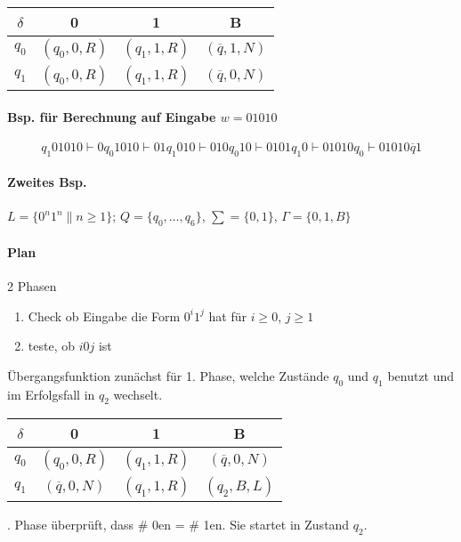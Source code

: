 \begin{table}[htb!]
\centering
\begin{tabular}{c|c c c}
$\delta$ & 0 & 1 & B \\
\hline 
$q_0$ & $(q_0,0,R)$ & $(q_1,1,R)$ & $(\overline{q},1,N)$ \\
$q_1$ & $(q_0,0,R)$ & $(q_1,1,R)$ & $(\overline{q},0,N)$ \\
\end{tabular}
\end{table}

\paragraph*{Bsp. für Berechnung auf Eingabe $w=01010$} $$q_1 01010 \vdash 0q_0 1010 \vdash 01q_1 010 \vdash 010q_0 10 \vdash 0101q_1 0 \vdash 01010q_0 \vdash 01010\overline{q}1$$

\paragraph*{Zweites Bsp.} $L=\{ 0^n1^n \| n \geq 1 \}$; $Q=\{ q_0,\dots,q_6 \}$, $\sum=\{0,1\}$, $\Gamma=\{0,1,B\}$

\paragraph*{Plan} 2 Phasen
\begin{enumerate}
	\item Check ob Eingabe die Form $0^i1^j$ hat für $i \geq 0$, $j \geq 1$
	\item teste, ob $i0j$ ist
\end{enumerate}
Übergangsfunktion zunächst für 1. Phase, welche Zustände $q_0$ und $q_1$ benutzt und im Erfolgsfall in $q_2$ wechselt.

\begin{table}[htb!]
\centering
\begin{tabular}{c|c c c}
$\delta$ & 0 & 1 & B \\
\hline 
$q_0$ & $(q_0,0,R)$ & $(q_1,1,R)$ & $(\overline{q},0,N)$ \\
$q_1$ & $(\overline{q},0,N)$ & $(q_1,1,R)$ & $(q_2,B,L)$ \\
\end{tabular}
\end{table}

\par{}. Phase überprüft, dass \# 0en = \# 1en. Sie startet in Zustand $q_2$.\par\medskip

